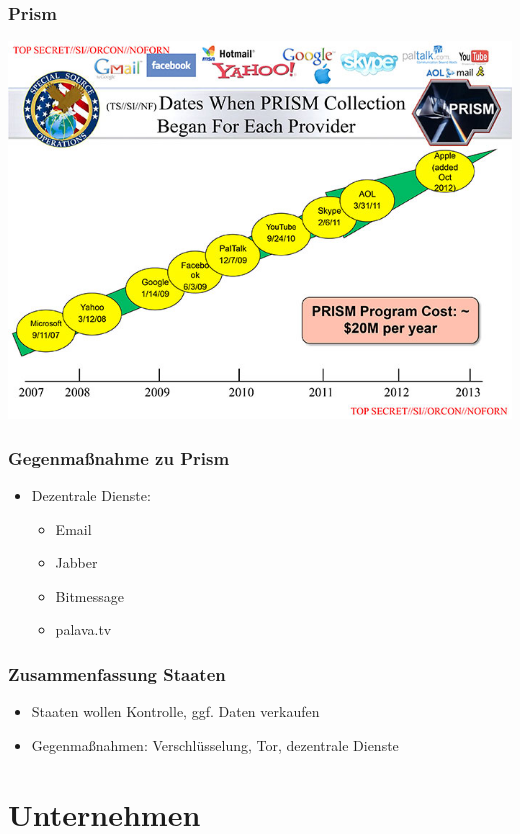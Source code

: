 \documentclass[12pt]{beamer}
\begin{document}
\begin{frame}
    \frametitle{Prism}
    \includegraphics[height=0.7\textheight]{img/prism.jpg}
\end{frame}

\begin{frame}
  \frametitle{Gegenmaßnahme zu Prism}
  \begin{itemize}
    \item<2-> Dezentrale Dienste:
      \begin{itemize}
        \item<3-> Email
        \item<4-> Jabber
        \item<5-> Bitmessage
        \item<6-> palava.tv
      \end{itemize}
  \end{itemize}
\end{frame}

\begin{frame}
  \frametitle{Zusammenfassung Staaten}
  \begin{itemize}
    \item<2-> Staaten wollen Kontrolle, ggf. Daten verkaufen
    \item<3-> Gegenmaßnahmen: Verschlüsselung, Tor, dezentrale Dienste
  \end{itemize}
\end{frame}

\section{Unternehmen}
\end{document}
